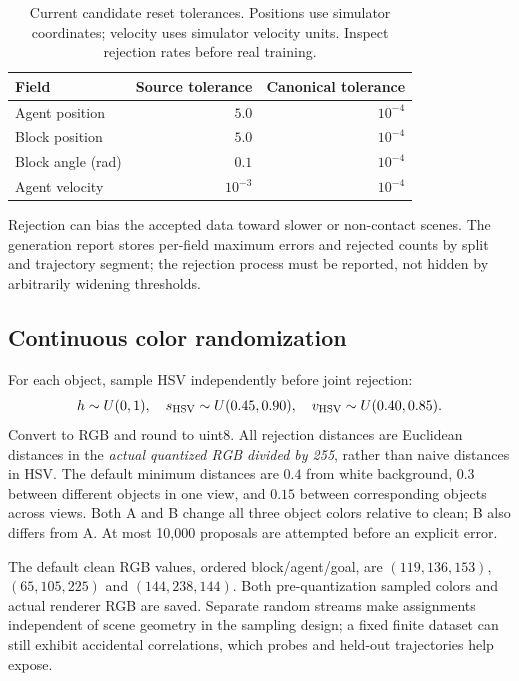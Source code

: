 \documentclass[11pt,a4paper]{article}
\begin{document}
\begin{table}[htbp]\centering\small
\begin{tabular}{lrr}
\toprule Field & Source tolerance & Canonical tolerance \\\midrule
Agent position & $5.0$ & $10^{-4}$ \\
Block position & $5.0$ & $10^{-4}$ \\
Block angle (rad) & $0.1$ & $10^{-4}$ \\
Agent velocity & $10^{-3}$ & $10^{-4}$ \\\bottomrule
\end{tabular}
\caption{Current candidate reset tolerances. Positions use simulator coordinates;
velocity uses simulator velocity units. Inspect rejection rates before real training.}
\end{table}

Rejection can bias the accepted data toward slower or non-contact scenes. The
generation report stores per-field maximum errors and rejected counts by split
and trajectory segment; the rejection process must be reported, not hidden by
arbitrarily widening thresholds.

\subsection{Continuous color randomization}
For each object, sample HSV independently before joint rejection:
\begin{equation}
h\sim U(0,1),\quad s_{\rm HSV}\sim U(0.45,0.90),\quad
v_{\rm HSV}\sim U(0.40,0.85).
\end{equation}
Convert to RGB and round to uint8. All rejection distances are Euclidean distances
in the \emph{actual quantized RGB divided by 255}, rather than naive distances in HSV.
The default minimum distances are $0.4$ from white background, $0.3$ between
different objects in one view, and $0.15$ between corresponding objects across views.
Both A and B change all three object colors relative to clean; B also differs from A.
At most 10,000 proposals are attempted before an explicit error.

The default clean RGB values, ordered block/agent/goal, are
$(119,136,153)$, $(65,105,225)$ and $(144,238,144)$. Both pre-quantization sampled
colors and actual renderer RGB are saved. Separate random streams make assignments
independent of scene geometry in the sampling design; a fixed finite dataset can
still exhibit accidental correlations, which probes and held-out trajectories help expose.
\end{document}
